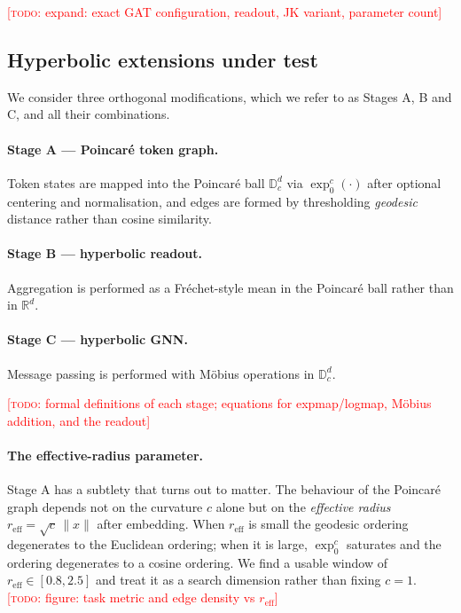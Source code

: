 \documentclass{article} %
\newcommand{\TODO}[1]{\textcolor{red}{[\textsc{todo}: #1]}}
\begin{document}
\TODO{expand: exact GAT configuration, readout, JK variant, parameter count}

\subsection{Hyperbolic extensions under test}
\label{sec:stages}
We consider three orthogonal modifications, which we refer to as Stages A, B
and C, and all their combinations.

\paragraph{Stage A --- Poincar\'e token graph.} Token states are mapped into the
Poincar\'e ball $\mathbb{D}^d_c$ via $\exp^c_0(\cdot)$ after optional centering
and normalisation, and edges are formed by thresholding \emph{geodesic}
distance rather than cosine similarity.

\paragraph{Stage B --- hyperbolic readout.} Aggregation is performed as a
Fr\'echet-style mean in the Poincar\'e ball rather than in $\mathbb{R}^d$.

\paragraph{Stage C --- hyperbolic GNN.} Message passing is performed with
M\"obius operations in $\mathbb{D}^d_c$.

\TODO{formal definitions of each stage; equations for expmap/logmap, M\"obius
addition, and the readout}

\paragraph{The effective-radius parameter.} Stage A has a subtlety that turns
out to matter. The behaviour of the Poincar\'e graph depends not on the
curvature $c$ alone but on the \emph{effective radius}
$r_{\text{eff}} = \sqrt{c}\,\lVert x \rVert$ after embedding. When
$r_{\text{eff}}$ is small the geodesic ordering degenerates to the Euclidean
ordering; when it is large, $\exp^c_0$ saturates and the ordering degenerates
to a cosine ordering. We find a usable window of
$r_{\text{eff}} \in [0.8, 2.5]$ and treat it as a search dimension rather than
fixing $c = 1$. \TODO{figure: task metric and edge density vs $r_{\text{eff}}$}
\end{document}
